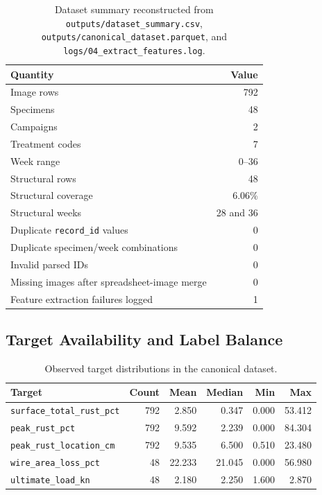 \documentclass[11pt,a4paper]{article}
\begin{document}
\begin{table}[H]
\centering
\small
\begin{tabular}{lr}
\toprule
\textbf{Quantity} & \textbf{Value} \\
\midrule
Image rows & 792 \\
Specimens & 48 \\
Campaigns & 2 \\
Treatment codes & 7 \\
Week range & 0--36 \\
Structural rows & 48 \\
Structural coverage & 6.06\% \\
Structural weeks & 28 and 36 \\
Duplicate \texttt{record\_id} values & 0 \\
Duplicate specimen/week combinations & 0 \\
Invalid parsed IDs & 0 \\
Missing images after spreadsheet-image merge & 0 \\
Feature extraction failures logged & 1 \\
\bottomrule
\end{tabular}
\caption{Dataset summary reconstructed from \texttt{outputs/dataset\_summary.csv}, \texttt{outputs/canonical\_dataset.parquet}, and \texttt{logs/04\_extract\_features.log}.}
\label{tab:dataset-summary}
\end{table}

\subsection{Target Availability and Label Balance}

\begin{table}[H]
\centering
\small
\begin{tabular}{lrrrrr}
\toprule
\textbf{Target} & \textbf{Count} & \textbf{Mean} & \textbf{Median} & \textbf{Min} & \textbf{Max} \\
\midrule
\texttt{surface\_total\_rust\_pct} & 792 & 2.850 & 0.347 & 0.000 & 53.412 \\
\texttt{peak\_rust\_pct} & 792 & 9.592 & 2.239 & 0.000 & 84.304 \\
\texttt{peak\_rust\_location\_cm} & 792 & 9.535 & 6.500 & 0.510 & 23.480 \\
\texttt{wire\_area\_loss\_pct} & 48 & 22.233 & 21.045 & 0.000 & 56.980 \\
\texttt{ultimate\_load\_kn} & 48 & 2.180 & 2.250 & 1.600 & 2.870 \\
\bottomrule
\end{tabular}
\caption{Observed target distributions in the canonical dataset.}
\label{tab:target-summary}
\end{table}
\end{document}
